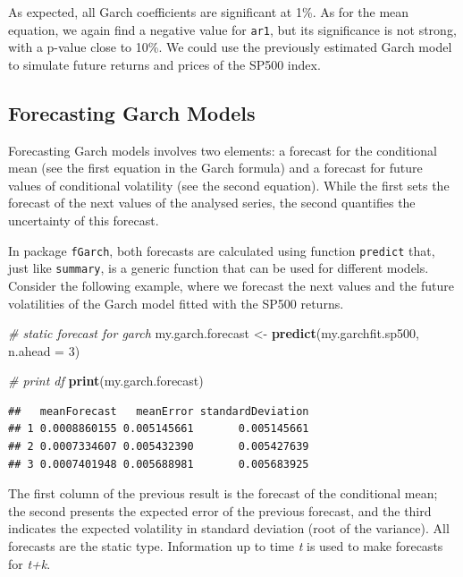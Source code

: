 \documentclass[11pt,]{book}
\newenvironment{Shaded}{\begin{snugshade}}{\end{snugshade}}
\newcommand{\KeywordTok}[1]{\textcolor[rgb]{0.27,0.27,0.27}{\textbf{#1}}}
\newcommand{\DataTypeTok}[1]{\textcolor[rgb]{0.27,0.27,0.27}{#1}}
\newcommand{\DecValTok}[1]{\textcolor[rgb]{0.06,0.06,0.06}{#1}}
\newcommand{\StringTok}[1]{\textcolor[rgb]{0.5,0.5,0.5}{#1}}
\newcommand{\CommentTok}[1]{\textcolor[rgb]{0.56,0.35,0.01}{\textit{#1}}}
\newcommand{\NormalTok}[1]{#1}
\begin{document}
As expected, all Garch coefficients are significant at 1\%. As for the
mean equation, we again find a negative value for \texttt{ar1}, but its
significance is not strong, with a p-value close to 10\%. We could use
the previously estimated Garch model to simulate future returns and
prices of the SP500 index.

\subsection{Forecasting Garch Models}\label{forecasting-garch-models}

Forecasting Garch models involves two elements: a forecast for the
conditional mean (see the first equation in the Garch formula) and a
forecast for future values of conditional volatility (see the second
equation). While the first sets the forecast of the next values of the
analysed series, the second quantifies the uncertainty of this forecast.

In package \texttt{fGarch}, both forecasts are calculated using function
\texttt{predict} that, just like \texttt{summary}, is a generic function
that can be used for different models. Consider the following example,
where we forecast the next values and the future volatilities of the
Garch model fitted with the SP500 returns. 

\begin{Shaded}
\begin{Highlighting}[]
\CommentTok{# static forecast for garch}
\NormalTok{my.garch.forecast <-}\StringTok{ }\KeywordTok{predict}\NormalTok{(my.garchfit.sp500, }\DataTypeTok{n.ahead =} \DecValTok{3}\NormalTok{)}

\CommentTok{# print df}
\KeywordTok{print}\NormalTok{(my.garch.forecast)}
\end{Highlighting}
\end{Shaded}

\begin{verbatim}
##   meanForecast   meanError standardDeviation
## 1 0.0008860155 0.005145661       0.005145661
## 2 0.0007334607 0.005432390       0.005427639
## 3 0.0007401948 0.005688981       0.005683925
\end{verbatim}

The first column of the previous result is the forecast of the
conditional mean; the second presents the expected error of the previous
forecast, and the third indicates the expected volatility in standard
deviation (root of the variance). All forecasts are the static type.
Information up to time \emph{t} is used to make forecasts for
\emph{t+k}.
\end{document}
